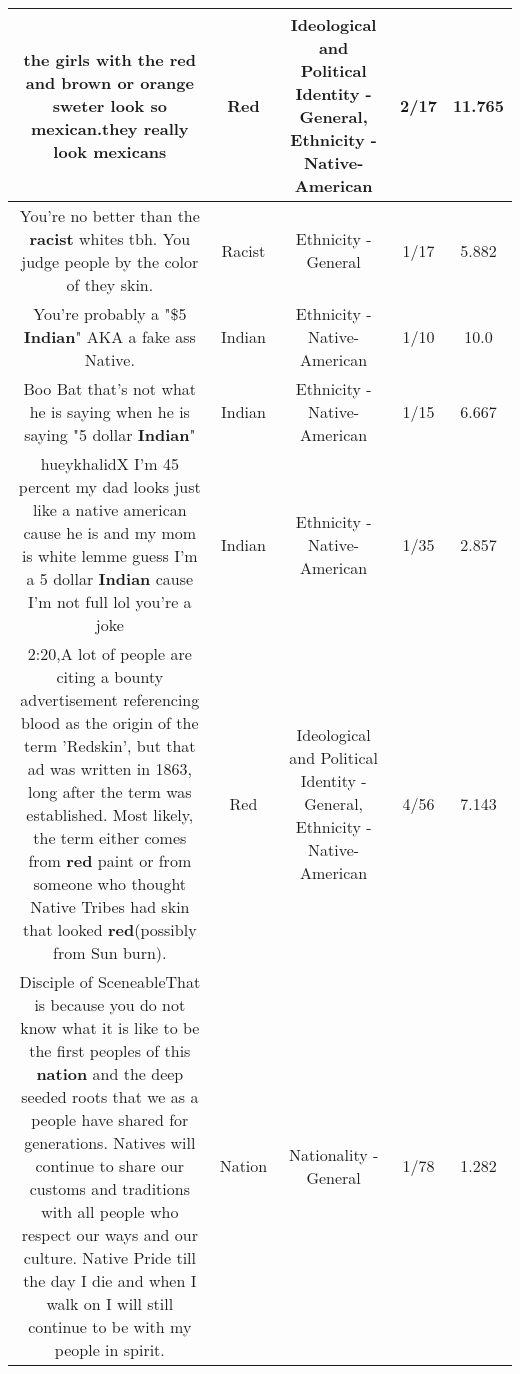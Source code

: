 \documentclass[11pt]{article}
\newlength\mylength
\begin{document}
\begin{center}
\begin{longtable}{|C{.65\mylength}|C{.30\mylength}|C{.12\mylength}|C{.12\mylength}|C{.12\mylength}|}
  \small the girls with the \textbf{r\textbf{ed}} and brown or orange sweter look so mexican.they really look mexicans\normalsize   & Red &  Ideological and Political Identity - General, Ethnicity - Native-American & 2/17 & 11.765 \\  \hline
  \small You're no better than the \textbf{racist} whites tbh. You judge people by the color of they skin.\normalsize   & Racist & Ethnicity - General & 1/17 & 5.882 \\  \hline
  \small You're probably a "\$5 \textbf{Indian}" AKA a fake ass Native.\normalsize   & Indian & Ethnicity - Native-American & 1/10 & 10.0 \\  \hline
  \small Boo Bat that's not what he is saying when he is saying "5 dollar \textbf{Indian}"\normalsize   & Indian & Ethnicity - Native-American & 1/15 & 6.667 \\  \hline
  \small hueykhalidX I'm 45 percent my dad looks just like a native american cause he is and my mom is white lemme guess I'm a 5 dollar \textbf{Indian} cause I'm not full lol you're a joke\normalsize   & Indian & Ethnicity - Native-American & 1/35 & 2.857 \\  \hline
  \small \@2:20,A lot of people are citing a bounty advertisement referencing blood as the origin of the term 'Redskin', but that ad was written in 1863, long after the term was established. Most likely, the term either comes from \textbf{r\textbf{ed}} paint or from someone who thought Native Tribes had skin that looked \textbf{r\textbf{ed}}(possibly from Sun burn).\normalsize   & Red &  Ideological and Political Identity - General, Ethnicity - Native-American & 4/56 & 7.143 \\  \hline
  \small Disciple of SceneableThat is because you do not know what it is like to be the first peoples of this \textbf{nation} and the deep seeded roots that we as a people have shared for generations. Natives  will continue to share our customs and traditions with all people who respect our ways and our culture. Native Pride till the day I die and when I walk on I will still continue to be with my people in spirit.\normalsize   & Nation & Nationality - General & 1/78 & 1.282 \\  \hline

\end{longtable}
\end{center}
\end{document}

